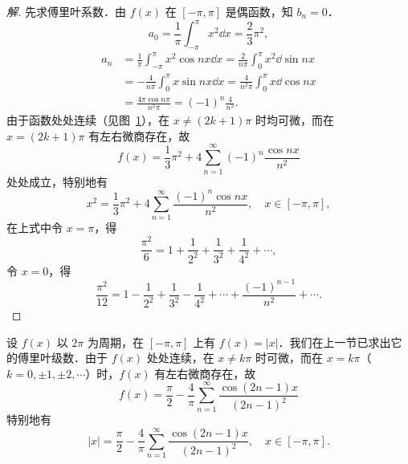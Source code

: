 \begin{proof}[解]
先求傅里叶系数．由 $f(x)$ 在 $[-\pi,\pi]$ 是偶函数，知 $b_{n}=0$．
\[
a_{0}=\frac{1}{\pi}\int_{-\pi}^{\pi}x^{2}\dd x=\frac{2}{3}\pi^{2},
\]
\[
\begin{aligned}
a_{n}&=\frac{1}{\pi}\int_{-\pi}^{\pi}x^{2}\cos nx\dd x=\frac{2}{n\pi}\int_{0}^{\pi}x^{2}\dd\sin nx\\
&=-\frac{4}{n\pi}\int_{0}^{\pi}x\sin nx\dd x=\frac{4}{n^{2}\pi}\int_{0}^{\pi}x\dd\cos nx\\
&=\frac{4\pi\cos n\pi}{n^{2}\pi}=(-1)^{n}\frac{4}{n^{2}}.
\end{aligned}
\]
由于函数处处连续（见图~\ref{fig:14-9}），在 $x\neq(2k+1)\pi$ 时均可微，而在 $x=(2k+1)\pi$ 有左右微商存在，故
\[
f(x)=\frac{1}{3}\pi^{2}+4\sum_{n=1}^{\infty}(-1)^{n}\frac{\cos nx}{n^{2}}
\]
处处成立，特别地有
\[
x^{2}=\frac{1}{3}\pi^{2}+4\sum_{n=1}^{\infty}\frac{(-1)^{n}\cos nx}{n^{2}},\quad x\in[-\pi,\pi],
\]
在上式中令 $x=\pi$，得
\[
\frac{\pi^{2}}{6}=1+\frac{1}{2^{2}}+\frac{1}{3^{2}}+\frac{1}{4^{2}}+\cdots,
\]
令 $x=0$，得
\[
\frac{\pi^{2}}{12}=1-\frac{1}{2^{2}}+\frac{1}{3^{2}}-\frac{1}{4^{2}}+\cdots+\frac{(-1)^{n-1}}{n^{2}}+\cdots.
\]
\end{proof}

\begin{figure}[htbp]
\centering
{}\caption{\relax}\label{fig:14-9}
\end{figure}

\begin{example}\label{ex:14-2-4}
设 $f(x)$ 以 $2\pi$ 为周期，在 $[-\pi,\pi]$ 上有 $f(x)=\left|x\right|$．我们在上一节已求出它的傅里叶级数．由于 $f(x)$ 处处连续，在 $x\neq k\pi$ 时可微，而在 $x=k\pi$（$k=0,\pm 1,\pm 2,\cdots$）时，$f(x)$ 有左右微商存在，故
\[
f(x)=\frac{\pi}{2}-\frac{4}{\pi}\sum_{n=1}^{\infty}\frac{\cos(2n-1)x}{(2n-1)^{2}}
\]
特别地有
\[
\left|x\right|=\frac{\pi}{2}-\frac{4}{\pi}\sum_{n=1}^{\infty}\frac{\cos(2n-1)x}{(2n-1)^{2}},\quad x\in[-\pi,\pi].
\]
\end{example}

